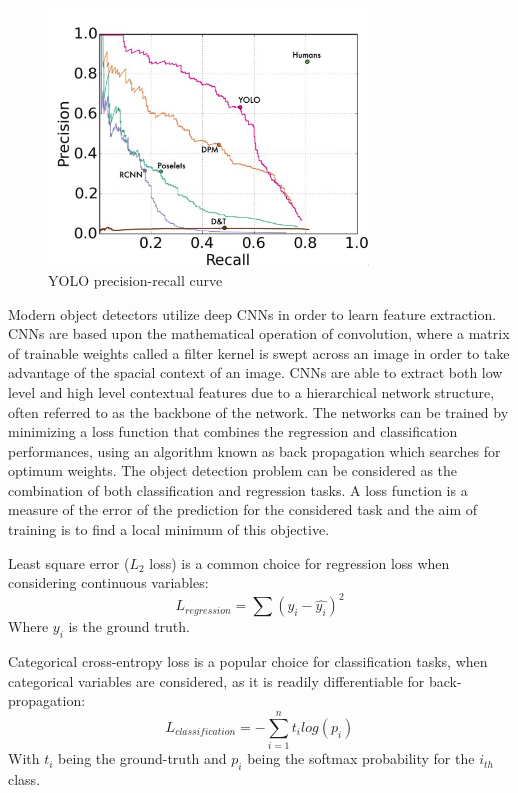 \documentclass[a4paper,twoside,12pt]{report}
\begin{document}
\begin{figure}[h!]
\begin{center}
\includegraphics[width=8.5cm]{images/yoloplot.jpg}
\caption{YOLO precision-recall curve \citep{yolo}}
\label{fig:yoloplot}
\end{center}
\end{figure}

Modern object detectors utilize deep CNNs in order to learn feature extraction. CNNs are based upon the mathematical operation of convolution, where a matrix of trainable weights called a filter kernel is swept across an image in order to take advantage of the spacial context of an image. CNNs are able to extract both low level and high level contextual features due to a hierarchical network structure, often referred to as the backbone of the network. The networks can be trained by minimizing a loss function that combines the regression and classification performances, using an algorithm known as back propagation which searches for optimum weights. The object detection problem can be considered as the combination of both classification and regression tasks. A loss function is a measure of the error of the prediction for the considered task and the aim of training is to find a local minimum of this objective.

Least square error ($L_2$ loss) is a common choice for regression loss when considering continuous variables:
\begin{equation}
L_{regression} = \sum(y_i-\hat{y_i})^2 
\end{equation} 
Where $y_i$ is the ground truth.

Categorical cross-entropy loss is a popular choice for classification tasks, when categorical variables are considered, as it is readily differentiable for back-propagation:
\begin{equation}
L_{classification} = -\sum_{i=1}^{n}t_i log(p_i)
\end{equation} 
With $t_i$ being the ground-truth and $p_i$ being the softmax probability for the $i_{th}$ class.
\end{document}
